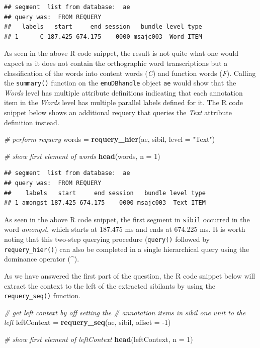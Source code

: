 \documentclass[]{book}
\newenvironment{Shaded}{\begin{snugshade}}{\end{snugshade}}
\newcommand{\CommentTok}[1]{\textcolor[rgb]{0.56,0.35,0.01}{\textit{#1}}}
\newcommand{\DataTypeTok}[1]{\textcolor[rgb]{0.13,0.29,0.53}{#1}}
\newcommand{\DecValTok}[1]{\textcolor[rgb]{0.00,0.00,0.81}{#1}}
\newcommand{\KeywordTok}[1]{\textcolor[rgb]{0.13,0.29,0.53}{\textbf{#1}}}
\newcommand{\NormalTok}[1]{#1}
\newcommand{\StringTok}[1]{\textcolor[rgb]{0.31,0.60,0.02}{#1}}
\theoremstyle{definition}
\theoremstyle{definition}
\theoremstyle{definition}
\theoremstyle{remark}
\begin{document}
\begin{verbatim}
## segment  list from database:  ae 
## query was:  FROM REQUERY 
##   labels   start     end session   bundle level type
## 1      C 187.425 674.175    0000 msajc003  Word ITEM
\end{verbatim}

As seen in the above R code snippet, the result is not quite what one
would expect as it does not contain the orthographic word transcriptions
but a classification of the words into content words (\emph{C}) and
function words (\emph{F}). Calling the \texttt{summary()} function on
the \texttt{emuDBhandle} object \texttt{ae} would show that the
\emph{Words} level has multiple attribute definitions indicating that
each annotation item in the \emph{Words} level has multiple parallel
labels defined for it. The R code snippet below shows an additional
requery that queries the \emph{Text} attribute definition instead.

\begin{Shaded}
\begin{Highlighting}[]
\CommentTok{# perform requery}
\NormalTok{words =}\StringTok{ }\KeywordTok{requery_hier}\NormalTok{(ae, sibil, }\DataTypeTok{level =} \StringTok{"Text"}\NormalTok{)}

\CommentTok{# show first element of words}
\KeywordTok{head}\NormalTok{(words, }\DataTypeTok{n =} \DecValTok{1}\NormalTok{)}
\end{Highlighting}
\end{Shaded}

\begin{verbatim}
## segment  list from database:  ae 
## query was:  FROM REQUERY 
##    labels   start     end session   bundle level type
## 1 amongst 187.425 674.175    0000 msajc003  Text ITEM
\end{verbatim}

As seen in the above R code snippet, the first segment in \texttt{sibil}
occurred in the word \emph{amongst}, which starts at 187.475 ms and ends
at 674.225 ms. It is worth noting that this two-step querying procedure
(\texttt{query()} followed by \texttt{requery\_hier()}) can also be
completed in a single hierarchical query using the dominance operator
(\^{}).

As we have answered the first part of the question, the R code snippet
below will extract the context to the left of the extracted sibilants by
using the \texttt{requery\_seq()} function.

\begin{Shaded}
\begin{Highlighting}[]
\CommentTok{# get left context by off setting the }
\CommentTok{# annotation items in sibil one unit to the left}
\NormalTok{leftContext =}\StringTok{ }\KeywordTok{requery_seq}\NormalTok{(ae, sibil, }\DataTypeTok{offset =} \DecValTok{-1}\NormalTok{)}

\CommentTok{# show first element of leftContext}
\KeywordTok{head}\NormalTok{(leftContext, }\DataTypeTok{n =} \DecValTok{1}\NormalTok{)}
\end{Highlighting}
\end{Shaded}
\end{document}
